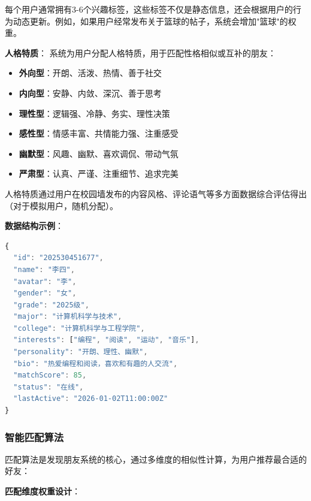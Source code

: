 \documentclass[12pt,a4paper]{article}
\begin{document}
每个用户通常拥有3-6个兴趣标签，这些标签不仅是静态信息，还会根据用户的行为动态更新。例如，如果用户经常发布关于篮球的帖子，系统会增加"篮球"的权重。

\textbf{人格特质}：
系统为用户分配人格特质，用于匹配性格相似或互补的朋友：

\begin{itemize}
    \item \textbf{外向型}：开朗、活泼、热情、善于社交
    \item \textbf{内向型}：安静、内敛、深沉、善于思考
    \item \textbf{理性型}：逻辑强、冷静、务实、理性决策
    \item \textbf{感性型}：情感丰富、共情能力强、注重感受
    \item \textbf{幽默型}：风趣、幽默、喜欢调侃、带动气氛
    \item \textbf{严肃型}：认真、严谨、注重细节、追求完美
\end{itemize}

人格特质通过用户在校园墙发布的内容风格、评论语气等多方面数据综合评估得出（对于模拟用户，随机分配）。

\textbf{数据结构示例}：
\begin{lstlisting}[language=JavaScript]
{
  "id": "202530451677",
  "name": "李四",
  "avatar": "李",
  "gender": "女",
  "grade": "2025级",
  "major": "计算机科学与技术",
  "college": "计算机科学与工程学院",
  "interests": ["编程", "阅读", "运动", "音乐"],
  "personality": "开朗、理性、幽默",
  "bio": "热爱编程和阅读，喜欢和有趣的人交流",
  "matchScore": 85,
  "status": "在线",
  "lastActive": "2026-01-02T11:00:00Z"
}
\end{lstlisting}

\subsubsection{智能匹配算法}

匹配算法是发现朋友系统的核心，通过多维度的相似性计算，为用户推荐最合适的好友：

\textbf{匹配维度权重设计}：
\end{document}
